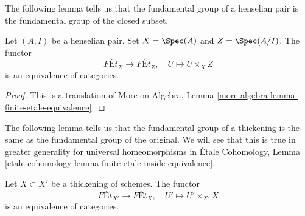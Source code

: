 \noindent
The following lemma tells us that the fundamental group of a henselian
pair is the fundamental group of the closed subset.

\begin{lemma}
\label{lemma-gabber}
Let $(A, I)$ be a henselian pair. Set $X = \Spec(A)$ and $Z = \Spec(A/I)$.
The functor
$$
\textit{F\'Et}_X \longrightarrow \textit{F\'Et}_Z,\quad
U \longmapsto U \times_X Z
$$
is an equivalence of categories.
\end{lemma}

\begin{proof}
This is a translation of
More on Algebra, Lemma \ref{more-algebra-lemma-finite-etale-equivalence}.
\end{proof}

\noindent
The following lemma tells us that the fundamental group of a thickening
is the same as the fundamental group of the original. We will see that
this is true in greater generality for universal homeomorphisms in
\'Etale Cohomology, Lemma
\ref{etale-cohomology-lemma-finite-etale-inside-equivalence}.

\begin{lemma}
\label{lemma-thickening}
Let $X \subset X'$ be a thickening of schemes. The functor
$$
\textit{F\'Et}_{X'} \longrightarrow \textit{F\'Et}_X,\quad
U' \longmapsto U' \times_{X'} X
$$
is an equivalence of categories.
\end{lemma}

